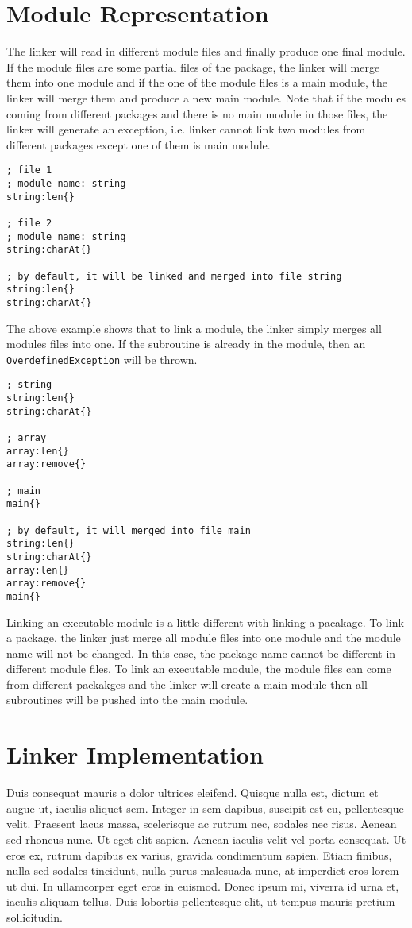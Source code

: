 \section{Module Representation}
The linker will read in different module files and finally produce one final module. If the module files are some partial files of the package, the linker will merge them into one module and if the one of the module files is a main module, the linker will merge them and produce a new main module. Note that if the modules coming from different packages and there is no main module in those files, the linker will generate an exception, i.e. linker cannot link two modules from different packages except one of them is main module.
\begin{lstlisting}[language=LucyX]
; file 1
; module name: string
string:len{}

; file 2
; module name: string
string:charAt{}

; by default, it will be linked and merged into file string
string:len{}
string:charAt{}
\end{lstlisting}
The above example shows that to link a module, the linker simply merges all modules files into one. If the subroutine is already in the module, then an \texttt{OverdefinedException} will be thrown.
\begin{lstlisting}[language=LucyX]
; string
string:len{}
string:charAt{}

; array
array:len{}
array:remove{}

; main
main{}

; by default, it will merged into file main
string:len{}
string:charAt{}
array:len{}
array:remove{}
main{}
\end{lstlisting}
Linking an executable module is a little different with linking a pacakage. To link a package, the linker just merge all module files into one module and the module name will not be changed. In this case, the package name cannot be different in different module files. To link an executable module, the module files can come from different packakges and the linker will create a main module then all subroutines will be pushed into the main module.

\section{Linker Implementation}
Duis consequat mauris a dolor ultrices eleifend. Quisque nulla est, dictum et augue ut, iaculis aliquet sem. Integer in sem dapibus, suscipit est eu, pellentesque velit. Praesent lacus massa, scelerisque ac rutrum nec, sodales nec risus. Aenean sed rhoncus nunc. Ut eget elit sapien. Aenean iaculis velit vel porta consequat. Ut eros ex, rutrum dapibus ex varius, gravida condimentum sapien. Etiam finibus, nulla sed sodales tincidunt, nulla purus malesuada nunc, at imperdiet eros lorem ut dui. In ullamcorper eget eros in euismod. Donec ipsum mi, viverra id urna et, iaculis aliquam tellus. Duis lobortis pellentesque elit, ut tempus mauris pretium sollicitudin.

